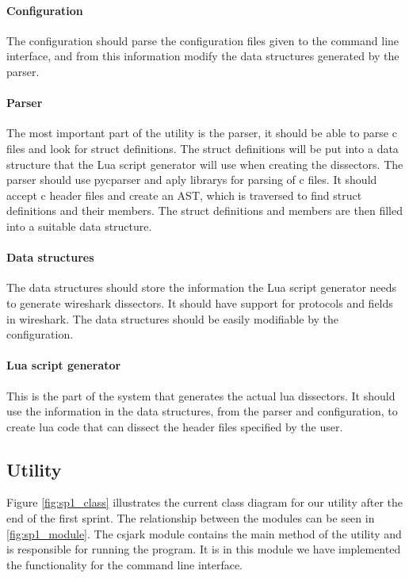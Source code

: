 \paragraph{Configuration}
The configuration should parse the configuration files given
to the command line interface, and from this information modify
the data structures generated by the parser.

\paragraph{Parser}
The most important part of the utility is the \gls{parser}, it should be able to parse \Gls{c} files and
look for \gls{struct} definitions. The \gls{struct} definitions will be put into a data structure
that the Lua script generator will use when creating the \glspl{dissector}.
The parser should use \gls{pycparser} and \gls{aply} \glspl{library} for parsing of \Gls{c} files. It should accept \Gls{c}
\gls{header} files and create an \gls{AST}, which is traversed
to find \gls{struct} definitions and their \glspl{member}. The \gls{struct} definitions and \glspl{member}
are then filled into a suitable data structure.

\paragraph{Data structures}
The data structures should store the information the Lua script generator needs to generate
\Gls{wireshark} \glspl{dissector}. It should have support for protocols and fields in \Gls{wireshark}.
The data structures should be easily modifiable by the configuration.

\paragraph{Lua script generator}
This is the part of the system that generates the actual \Gls{lua} \glspl{dissector}.
It should use the information in the data structures, from the 
parser and configuration, to create \Gls{lua} code that can dissect
the \gls{header} files specified by the user. 

\subsection{Utility}
Figure \ref{fig:sp1_class} illustrates the current class diagram for our
\gls{utility} after the end of the first sprint. The relationship between 
the modules can be seen in \autoref{fig:sp1_module}. The csjark module contains the main
method of the \gls{utility} and is responsible for running the program.
It is in this module we have implemented the functionality for the command line interface.

